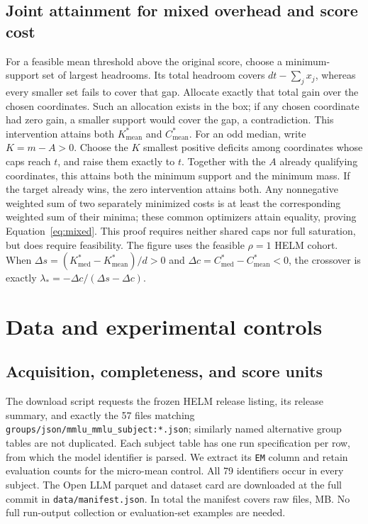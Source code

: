 \documentclass{article}
\newcommand{\mean}{\mathrm{mean}}
\newcommand{\med}{\mathrm{med}}
\begin{document}
\subsection{Joint attainment for mixed overhead and score cost}
\label{app:mixed}
For a feasible mean threshold above the original score, choose a minimum-support
set of largest headrooms. Its total headroom covers $dt-\sum_jx_j$, whereas
every smaller set fails to cover that gap. Allocate exactly that total gain over
the chosen coordinates. Such an allocation exists in the box; if any chosen
coordinate had zero gain, a smaller support would cover the gap, a contradiction.
This intervention attains both $K^*_\mean$ and $C^*_\mean$.
For an odd median, write $K=m-A>0$. Choose the $K$ smallest positive deficits
among coordinates whose caps reach $t$, and raise them exactly to $t$.
Together with the $A$ already qualifying coordinates, this attains both the
minimum support and the minimum mass. If the target already wins, the zero
intervention attains both. Any nonnegative weighted sum of two separately
minimized costs is at least the corresponding weighted sum of their minima;
these common optimizers attain equality, proving Equation~\ref{eq:mixed}.
This proof requires neither shared caps nor full saturation, but does require
feasibility. The figure uses the feasible $\rho=1$ HELM cohort.
When $\Delta s=(K^*_\med-K^*_\mean)/d>0$ and
$\Delta c=C^*_\med-C^*_\mean<0$, the crossover is exactly
$\lambda_*=-\Delta c/(\Delta s-\Delta c)$.

\section{Data and experimental controls}
\label{app:controls}
\subsection{Acquisition, completeness, and score units}
The download script requests the frozen HELM release listing, its release summary,
and exactly the 57 files matching
\texttt{groups/json/mmlu\_mmlu\_subject:*.json}; similarly named alternative
group tables are not duplicated. Each subject table has one run specification per
row, from which the model identifier is parsed. We extract its \texttt{EM} column
and retain evaluation counts for the micro-mean control. All 79 identifiers occur
in every subject. The Open LLM parquet and dataset card are downloaded at the full
commit in \texttt{data/manifest.json}. In total the manifest covers \RawFiles{}
raw files, \RawMB{} MB. No full run-output collection or evaluation-set examples
are needed.
\end{document}

